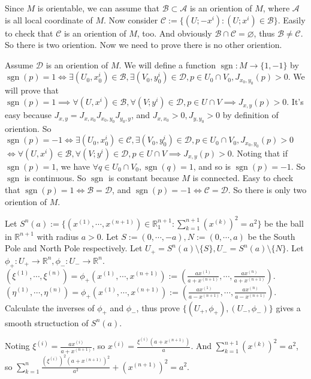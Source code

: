 \documentclass{ctexart}
\DeclareMathOperator{\sgn}{sgn}
\begin{document}
\begin{solution}
  Since \(M\) is orientable, we can assume that \(\mathcal{B} \subset \mathcal{A}\) is an oriention of \(M\), where \(\mathcal{A}\) is all local coordinate of \(M\).
  Now consider \(\mathcal{C}:=\{(U;-x^i):(U;x^i) \in \mathcal{B}\}\). Easily to check that \(\mathcal{C}\) is an oriention of \(M\), too.
  And obviously \(\mathcal{B} \cap \mathcal{C} = \varnothing\), thus \(\mathcal{B} \neq \mathcal{C}\). So there is two oriention. Now we need to prove there is no other oriention.

  Assume \(\mathcal{D}\) is an oriention of \(M\). We will define a function \(\sgn:M \to \{1,-1\}\) by
  \(\sgn(p)=1 \iff \exists (U_0,x_0^i) \in \mathcal{B},\exists (V_0,y_0^i) \in \mathcal{D},p \in U_0 \cap V_0,J_{x_0,y_0}(p)>0\).
  We will prove that \(\sgn(p)=1 \implies \forall (U,x^i) \in \mathcal{B},\forall (V;y^i) \in \mathcal{D},p \in U \cap V \implies J_{x,y}(p)>0\).
  It's easy because \(J_{x,y}=J_{x,x_0}J_{x_0,y_0}J_{y_0,y}\), and \(J_{x,x_0}>0,J_{y,y_0}>0\) by definition of oriention.
  So \(\sgn(p)=-1 \iff \exists (U_0,x_0^i) \in \mathcal{C},\exists (V_0,y_0^i) \in \mathcal{D},p \in U_0 \cap V_0,J_{x_0,y_0}(p)>0 \)
  \(\iff \forall (U,x^i) \in \mathcal{B},\forall (V;y^i) \in \mathcal{D},p \in U \cap V \implies J_{x,y}(p)>0 \).
  Noting that if \(\sgn(p)=1\), we have \(\forall q \in U_0 \cap V_0,\sgn(q)=1\), and so is \(\sgn(p)=-1\).
  So \(\sgn\) is continuous. So \(\sgn\) is constant because \(M\) is connected.
  Easy to check that \(\sgn(p)=1 \iff \mathcal{B}=\mathcal{D}\), and \(\sgn(p)=-1 \iff \mathcal{C}=\mathcal{D}\).
  So there is only two oriention of \(M\).
\end{solution}

\begin{problem}\label{pro:1.4}
  Let \(S^n(a):=\{(x^{(1)},\cdots,x^{(n + 1)} )\in \mathbb{R}_1^{n+1} :\sum_{k=1}^{n+1} (x^{(k)})^2=a^2\}\) be the ball in \(\mathbb{R}^{n+1}\) with radius \(a>0\).
  Let \(S:=(0,\cdots,-a),N:=(0,\cdots,a)\) be the South Pole and North Pole respectively.
  Let \(U_+=S^n(a)\setminus\{S\},U_-=S^n(a)\setminus\{N\}\).
  Let \(\phi_+:U_+ \to \mathbb{R}^n,\phi_-:U_- \to \mathbb{R}^n\).
  \((\xi^{(1)},\cdots,\xi^{(n)})=\phi_+(x^{(1)},\cdots,x^{(n+1)}):=\left(\frac{ax^{(1)}}{a+x^{(n+1)}},\cdots,\frac{ax^{(n)}}{a+x^{(n+1)}}\right)\).
  \((\eta^{(1)},\cdots,\eta^{(n)})=\phi_+(x^{(1)},\cdots,x^{(n+1)}):=\left(\frac{ax^{(1)}}{a-x^{(n+1)}},\cdots,\frac{ax^{(n)}}{a-x^{(n+1)}}\right)\).
  Calculate the inverses of \(\phi_+\) and \(\phi_-\), thus prove \(\{(U_+,\phi_+),(U_-,\phi_-)\}\) gives a smooth structuction of \(S^n(a)\).
\end{problem}
\begin{solution}
  Noting \(\xi^{(i)}=\frac{a x^{(i)}}{a+x^{(n+1)}}\), so \(x^{(i)}=\frac{\xi^{(i)}(a+x^{(n+1)})}{a}\).
  And \(\sum_{k=1}^{n+1} (x^{(k)})^2=a^2\), so \(\sum_{k=1}^{n} \frac{(\xi^{(i)})^2 (a+x^{(n+1)})^2}{a^2} + (x^{(n+1)})^2 = a^2\).
\end{solution}
\begin{problem}\label{pro:1.5}
\end{problem}
\end{document}
